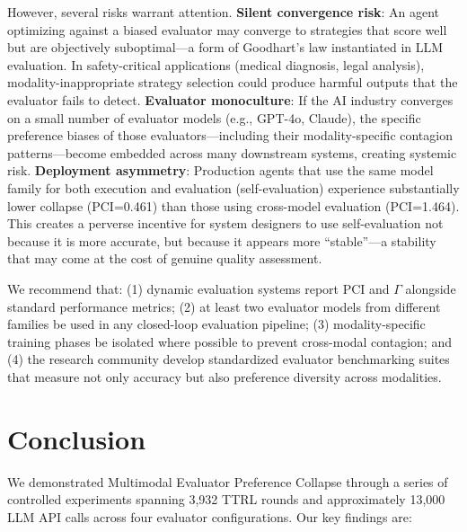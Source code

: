 \documentclass[11pt,a4paper]{article}
\begin{document}
However, several risks warrant attention. \textbf{Silent convergence risk}: An agent optimizing against a biased evaluator may converge to strategies that score well but are objectively suboptimal---a form of Goodhart's law instantiated in LLM evaluation. In safety-critical applications (medical diagnosis, legal analysis), modality-inappropriate strategy selection could produce harmful outputs that the evaluator fails to detect. \textbf{Evaluator monoculture}: If the AI industry converges on a small number of evaluator models (e.g., GPT-4o, Claude), the specific preference biases of those evaluators---including their modality-specific contagion patterns---become embedded across many downstream systems, creating systemic risk. \textbf{Deployment asymmetry}: Production agents that use the same model family for both execution and evaluation (self-evaluation) experience substantially lower collapse (PCI=0.461) than those using cross-model evaluation (PCI=1.464). This creates a perverse incentive for system designers to use self-evaluation not because it is more accurate, but because it appears more ``stable''---a stability that may come at the cost of genuine quality assessment.

We recommend that: (1) dynamic evaluation systems report PCI and $\Gamma$ alongside standard performance metrics; (2) at least two evaluator models from different families be used in any closed-loop evaluation pipeline; (3) modality-specific training phases be isolated where possible to prevent cross-modal contagion; and (4) the research community develop standardized evaluator benchmarking suites that measure not only accuracy but also preference diversity across modalities.

\section{Conclusion}
We demonstrated Multimodal Evaluator Preference Collapse through a series of controlled experiments spanning 3,932 TTRL rounds and approximately 13,000 LLM API calls across four evaluator configurations. Our key findings are:
\end{document}
